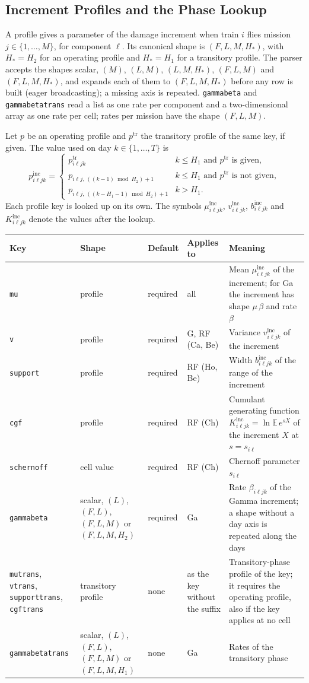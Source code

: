 \documentclass[11pt,a4paper]{article}
\makeatletter
\theoremstyle{plain}
\theoremstyle{definition}
\newcommand{\inc}{\mathrm{inc}}
\newcommand{\tr}{\mathrm{tr}}
\renewcommand{\_}{\textunderscore\allowbreak{}}
\providecommand{\keyrow}[5]{{\raggedright #1\par} & {\raggedright #2\par} & {\raggedright #3\par} & {\raggedright #4\par} & {\raggedright #5\par} \\}
\providecommand{\tabstart}[2]{\begingroup\small\begin{longtable}{@{}#1@{}}\toprule #2 \\ \midrule \endhead}
\providecommand{\tabend}{\bottomrule\end{longtable}\endgroup}
\providecommand{\keytab}{\tabstart{p{3.2cm}p{2.2cm}p{1.8cm}p{1.9cm}p{4.5cm}}{Key & Shape & Default & Applies to & Meaning}}
\makeatother
\begin{document}
\subsection{Increment Profiles and the Phase Lookup}\label{sec:input_increments}

A profile gives a parameter of the damage increment when train $i$ flies mission $j \in \{1,\ldots,M\}$, for component $\ell$.
Its canonical shape is $(F, L, M, H_*)$, with $H_* = H_2$ for an operating profile and $H_* = H_1$ for a transitory profile.
The parser accepts the shapes scalar, $(M)$, $(L, M)$, $(L, M, H_*)$, $(F, L, M)$ and $(F, L, M, H_*)$, and expands each of them to $(F, L, M, H_*)$ before any row is built (eager broadcasting); a missing axis is repeated.
\texttt{gamma\_beta} and \texttt{gamma\_beta\_trans} read a list as one rate per component and a two-dimensional array as one rate per cell; rates per mission have the shape $(F, L, M)$.

Let $p$ be an operating profile and $p^{\tr}$ the transitory profile of the same key, if given.
The value used on day $k \in \{1,\ldots,T\}$ is
\begin{equation}\label{eq:c_phase}
p^{\inc}_{i\ell jk} =
\begin{cases}
p^{\tr}_{i\ell jk} & k \le H_1 \text{ and } p^{\tr} \text{ is given},\\[2pt]
p_{i\ell j,\,((k-1) \bmod H_2) + 1} & k \le H_1 \text{ and } p^{\tr} \text{ is not given},\\[2pt]
p_{i\ell j,\,((k-H_1-1) \bmod H_2) + 1} & k > H_1.
\end{cases}
\end{equation}
Each profile key is looked up on its own.
The symbols $\mu^{\inc}_{i\ell jk}$, $v^{\inc}_{i\ell jk}$, $b^{\inc}_{i\ell jk}$ and $K^{\inc}_{i\ell jk}$ denote the values after the lookup.

\keytab
\keyrow{\texttt{mu}}{profile}{required}{all}{Mean $\mu^{\inc}_{i\ell jk}$ of the increment; for Ga the increment has shape $\mu\,\beta$ and rate $\beta$}
\keyrow{\texttt{v}}{profile}{required}{G, RF (Ca, Be)}{Variance $v^{\inc}_{i\ell jk}$ of the increment}
\keyrow{\texttt{support}}{profile}{required}{RF (Ho, Be)}{Width $b^{\inc}_{i\ell jk}$ of the range of the increment}
\keyrow{\texttt{cgf}}{profile}{required}{RF (Ch)}{Cumulant generating function $K^{\inc}_{i\ell jk} = \ln \mathbb{E}\,e^{s X}$ of the increment $X$ at $s = s_{i\ell}$}
\keyrow{\texttt{s\_chernoff}}{cell value}{required}{RF (Ch)}{Chernoff parameter $s_{i\ell}$}
\keyrow{\texttt{gamma\_beta}}{scalar, $(L)$, $(F, L)$, $(F, L, M)$ or $(F, L, M, H_2)$}{required}{Ga}{Rate $\beta_{i\ell jk}$ of the Gamma increment; a shape without a day axis is repeated along the days}
\keyrow{\texttt{mu\_trans}, \texttt{v\_trans}, \texttt{support\_trans}, \texttt{cgf\_trans}}{transitory profile}{none}{as the key without the suffix}{Transitory-phase profile of the key; it requires the operating profile, also if the key applies at no cell}
\keyrow{\texttt{gamma\_beta\_trans}}{scalar, $(L)$, $(F, L)$, $(F, L, M)$ or $(F, L, M, H_1)$}{none}{Ga}{Rates of the transitory phase}
\tabend
\end{document}
